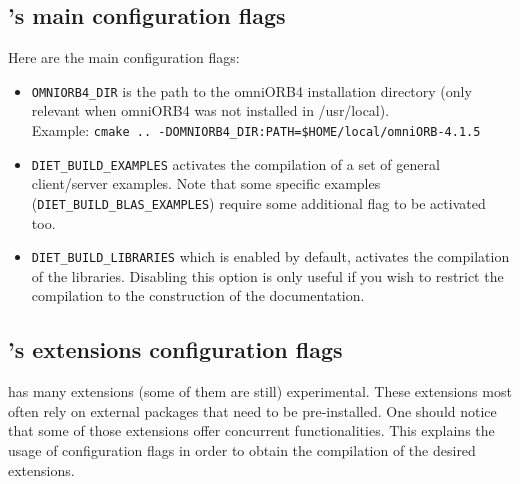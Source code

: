 \subsection{\diet's main configuration flags}

Here are the main configuration flags:
\begin{itemize}
\item
  \verb+OMNIORB4_DIR+ is the path to the omniORB4 installation
  directory (only relevant when omniORB4 was not installed in
  /usr/local).\\ Example:
  \verb+cmake .. -DOMNIORB4_DIR:PATH=$HOME/local/omniORB-4.1.5+

\item
  \verb+DIET_BUILD_EXAMPLES+ activates the compilation of a set of
  general client/server examples. Note that some specific examples
  (\eg \verb+DIET_BUILD_BLAS_EXAMPLES+) require some additional flag
  to be activated too.

\item
  \verb+DIET_BUILD_LIBRARIES+ which is enabled by default, activates the
  compilation of the \diet libraries. Disabling this option is only useful if
  you wish to restrict the compilation to the construction of the
  documentation.
\end{itemize}

\subsection{\diet's extensions configuration flags}

\diet has many extensions (some of them are still) experimental. These
extensions most often rely on external packages that need to be
pre-installed. One should notice that some of those extensions offer concurrent
functionalities. This explains the usage of configuration flags in order to
obtain the compilation of the desired extensions.

